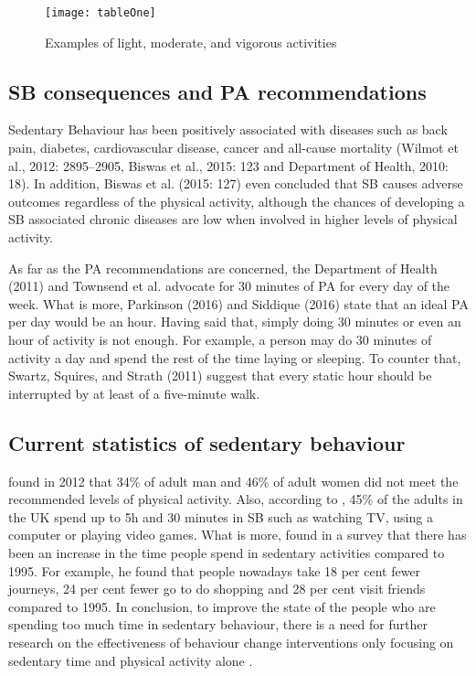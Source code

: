    \begin{figure}[h]
        \centering
        \texttt{[image: tableOne]}
        \caption{Examples of light, moderate, and vigorous activities \citep{harvardthchanschoolofpublichealth2012}}
        \label{fig:activity-intensities}
    \end{figure}
    
    \subsection{SB consequences and PA recommendations}
    Sedentary Behaviour has been positively associated with diseases such as back pain, diabetes, cardiovascular disease, cancer and all-cause mortality (Wilmot et al., 2012: 2895–2905, Biswas et al., 2015: 123 and Department of Health, 2010: 18). In addition, Biswas et al. (2015: 127) even concluded that SB causes adverse outcomes regardless of the physical activity, although the chances of developing a SB associated chronic diseases are low when involved in higher levels of physical activity.
    
    As far as the PA recommendations are concerned, the Department of Health (2011) and Townsend et al. advocate for 30 minutes of PA for every day of the week. What is more, Parkinson (2016) and Siddique (2016) state that an ideal PA per day would be an hour. Having said that, simply doing 30 minutes or even an hour of activity is not enough. For example, a person may do 30 minutes of activity a day and spend the rest of the time laying or sleeping. To counter that, Swartz, Squires, and Strath (2011) suggest that every static hour should be interrupted by at least of a five-minute walk.
    
    \subsection{Current statistics of sedentary behaviour}
    \citet[19]{townsend2015} found in 2012 that 34\% of adult man and 46\% of adult women did not meet the recommended levels of physical activity. Also, according to \citet[81]{townsend2015}, 45\% of the adults in the UK spend up to 5h and 30 minutes in SB such as watching TV, using a computer or playing video games. What is more, \citet{swinford2014} found in a survey that there has been an increase in the time people spend in sedentary activities compared to 1995. For example, he found that people nowadays take 18 per cent fewer journeys, 24 per cent fewer go to do shopping and 28 per cent visit friends compared to 1995. In conclusion, to improve the state of the people who are spending too much time in sedentary behaviour, there is a need for further research on the effectiveness of behaviour change interventions only focusing on sedentary time and physical activity alone \citep[130]{biswas2015}.

